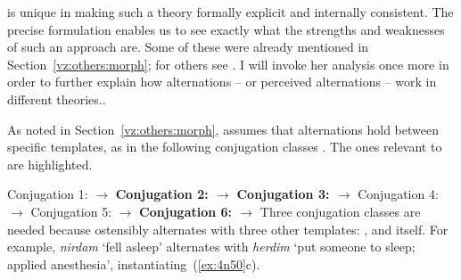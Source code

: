 \begin{exe}
\begin{xlist}
\begin{xlist}
\begin{exe}
\begin{exe}
\begin{xlist}
\begin{exe}
\begin{xlist}
\begin{exe}
\begin{xlist}
\begin{xlist}
\begin{exe}
\begin{xlist}
\begin{exe}
\begin{xlist}
\begin{exe}
\begin{exe}
\begin{exe}
\begin{xlist}
\begin{exe}
\begin{exe}
\begin{xlist}
\begin{xlist}
\begin{exe}
\begin{xlist}
\begin{exe}
\begin{exe}
\begin{exe}
\begin{xlist}
\begin{exe}
\begin{exe}
\begin{xlist}
\begin{exe}
\begin{xlist}
\begin{exe}
\begin{xlist}
\begin{exe}
\begin{xlist}
\begin{exe}
\begin{exe}
\begin{xlist}
\begin{exe}
\begin{exe}
\begin{xlist}
\begin{xlist}
\begin{exe}
\begin{xlist}
\begin{xlist}
\begin{exe}
\begin{xlist}
\begin{exe}
\begin{xlist}
\begin{exe}
\begin{xlist}
\begin{exe}
\begin{xlist}
\begin{exe}
\begin{exe}
\begin{exe}
\begin{exe}
\begin{xlist}
\begin{exe}
\begin{exe}
\begin{xlist}
\begin{xlist}
\begin{exe}
\cite{arad05} is unique in making such a theory formally explicit and internally consistent. The precise formulation enables us to see exactly what the strengths and weaknesses of such an approach are. Some of these were already mentioned in Section~\ref{vz:others:morph}; for others see \cite{kastnertucker19cup}. I will invoke her analysis once more in order to further explain how alternations -- or perceived alternations -- work in different theories..

As noted in Section~\ref{vz:others:morph}, \cite{arad05} assumes that alternations hold between specific templates, as in the following conjugation classes \citep[226]{arad05}. The ones relevant to {\thif} are highlighted.
 \begin{exe}
 \ex  \label{ex:4n50}
 \begin{xlist} 
 	\ex  Conjugation 1: {\tnif} $\rightarrow$ {\tkal} 
 	\ex  \textbf{Conjugation 2: {\tkal} $\rightarrow$ {\thif}} 
 	\ex  \textbf{Conjugation 3: {\tnif} $\rightarrow$ {\thif}} 
 	\ex  Conjugation 4: {\thit} $\rightarrow$ {\tpie} 
 	\ex  Conjugation 5: {\thit} $\rightarrow$ {\tpie} 
 	\ex  \textbf{Conjugation 6: {\thif} $\rightarrow$ {\thif}} 
 \z
\z 
Three conjugation classes are needed because {\thif} ostensibly alternates with three other templates: {\tkal}, {\tnif} and {\thif} itself. For example, \emph{nirdam} `fell asleep' alternates with \emph{herdim} `put someone to sleep; applied anesthesia', instantiating~(\ref{ex:4n50}c).


\end{xlist}
\end{exe}
\end{exe}
\end{xlist}
\end{xlist}
\end{exe}
\end{exe}
\end{xlist}
\end{exe}
\end{exe}
\end{exe}
\end{exe}
\end{xlist}
\end{exe}
\end{xlist}
\end{exe}
\end{xlist}
\end{exe}
\end{xlist}
\end{exe}
\end{xlist}
\end{xlist}
\end{exe}
\end{xlist}
\end{xlist}
\end{exe}
\end{exe}
\end{xlist}
\end{exe}
\end{exe}
\end{xlist}
\end{exe}
\end{xlist}
\end{exe}
\end{xlist}
\end{exe}
\end{xlist}
\end{exe}
\end{exe}
\end{xlist}
\end{exe}
\end{exe}
\end{exe}
\end{xlist}
\end{exe}
\end{xlist}
\end{xlist}
\end{exe}
\end{exe}
\end{xlist}
\end{exe}
\end{exe}
\end{exe}
\end{xlist}
\end{exe}
\end{xlist}
\end{exe}
\end{xlist}
\end{xlist}
\end{exe}
\end{xlist}
\end{exe}
\end{xlist}
\end{exe}
\end{exe}
\end{xlist}
\end{xlist}
\end{exe}
